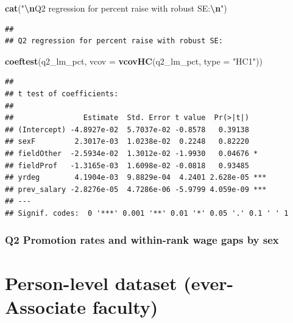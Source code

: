 \documentclass[
]{article}
\newenvironment{Shaded}{\begin{snugshade}}{\end{snugshade}}
\newcommand{\AttributeTok}[1]{\textcolor[rgb]{0.13,0.29,0.53}{#1}}
\newcommand{\FunctionTok}[1]{\textcolor[rgb]{0.13,0.29,0.53}{\textbf{#1}}}
\newcommand{\NormalTok}[1]{#1}
\newcommand{\SpecialCharTok}[1]{\textcolor[rgb]{0.81,0.36,0.00}{\textbf{#1}}}
\newcommand{\StringTok}[1]{\textcolor[rgb]{0.31,0.60,0.02}{#1}}
\begin{document}
\begin{Shaded}
\begin{Highlighting}[]
\FunctionTok{cat}\NormalTok{(}\StringTok{"}\SpecialCharTok{\textbackslash{}n}\StringTok{Q2 regression for percent raise with robust SE:}\SpecialCharTok{\textbackslash{}n}\StringTok{"}\NormalTok{)}
\end{Highlighting}
\end{Shaded}

\begin{verbatim}
## 
## Q2 regression for percent raise with robust SE:
\end{verbatim}

\begin{Shaded}
\begin{Highlighting}[]
\FunctionTok{coeftest}\NormalTok{(q2\_lm\_pct, }\AttributeTok{vcov =} \FunctionTok{vcovHC}\NormalTok{(q2\_lm\_pct, }\AttributeTok{type =} \StringTok{"HC1"}\NormalTok{))}
\end{Highlighting}
\end{Shaded}

\begin{verbatim}
## 
## t test of coefficients:
## 
##                Estimate  Std. Error t value  Pr(>|t|)    
## (Intercept) -4.8927e-02  5.7037e-02 -0.8578   0.39138    
## sexF         2.3017e-03  1.0238e-02  0.2248   0.82220    
## fieldOther  -2.5934e-02  1.3012e-02 -1.9930   0.04676 *  
## fieldProf   -1.3165e-03  1.6098e-02 -0.0818   0.93485    
## yrdeg        4.1904e-03  9.8829e-04  4.2401 2.628e-05 ***
## prev_salary -2.8276e-05  4.7286e-06 -5.9799 4.059e-09 ***
## ---
## Signif. codes:  0 '***' 0.001 '**' 0.01 '*' 0.05 '.' 0.1 ' ' 1
\end{verbatim}

\subsubsection{Q2 Promotion rates and within-rank wage gaps by
sex}\label{q2-promotion-rates-and-within-rank-wage-gaps-by-sex}

\section{Person-level dataset (ever-Associate
faculty)}\label{person-level-dataset-ever-associate-faculty}
\end{document}
